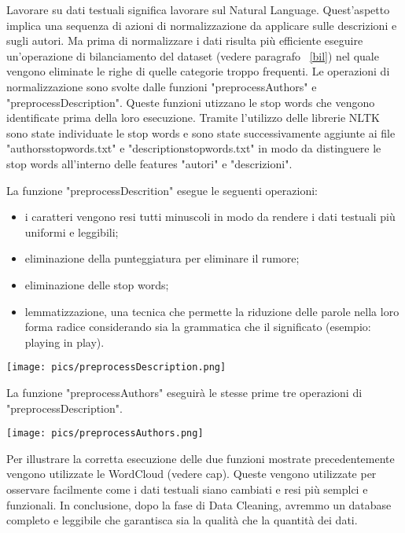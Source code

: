 \documentclass[12pt,oneside]{article}
\begin{document}
\begin{enumerate}
    \begin{justify}
    Lavorare su dati testuali significa lavorare sul Natural Language. Quest'aspetto implica una sequenza di azioni di normalizzazione da applicare sulle descrizioni e sugli autori. Ma prima di normalizzare i dati risulta più efficiente eseguire un'operazione di bilanciamento del dataset (vedere paragrafo ~\ref{bil}) nel quale vengono eliminate le righe di quelle categorie troppo frequenti.
    Le operazioni di normalizzazione sono svolte dalle funzioni "preprocessAuthors" e "preprocessDescription". Queste funzioni utizzano le stop words che vengono identificate prima della loro esecuzione. Tramite l'utilizzo delle librerie NLTK sono state individuate le stop words e sono state successivamente aggiunte ai file "authors\textunderscore{}stopwords.txt" e "description\textunderscore{}stopwords.txt" in modo da distinguere le stop words all'interno delle features "autori" e "descrizioni". 
    \end{justify}
    \newpage
    \begin{justify}
    \hypertarget{preD}{
    La funzione "preprocessDescrition" esegue le seguenti operazioni:
    \begin{itemize}
        \item i caratteri vengono resi tutti minuscoli in modo da rendere i dati testuali più uniformi e leggibili;
        \item eliminazione della punteggiatura per eliminare il rumore;
        \item eliminazione delle stop words;
        \item lemmatizzazione, una tecnica che permette la riduzione delle parole nella loro forma radice considerando sia la grammatica che il significato (esempio: playing in play).
    \end{itemize}
    }
    \end{justify}
    \texttt{[image: pics/preprocessDescription.png]}
    \newpage
    \begin{justify}
    \hypertarget{preA}{
    La funzione "preprocessAuthors" eseguirà le stesse prime tre operazioni di "preprocessDescription".
    }
    \end{justify}
    
    \texttt{[image: pics/preprocessAuthors.png]}
    \begin{justify}
    Per illustrare la corretta esecuzione delle due funzioni mostrate precedentemente vengono utilizzate le WordCloud (vedere cap). Queste vengono utilizzate per osservare facilmente come i dati testuali siano cambiati e resi più semplci e funzionali.
    In conclusione, dopo la fase di Data Cleaning, avremmo un database completo e leggibile che garantisca sia la qualità che la quantità dei dati. 
    \end{justify}
    \end{enumerate}
    
\end{document}
